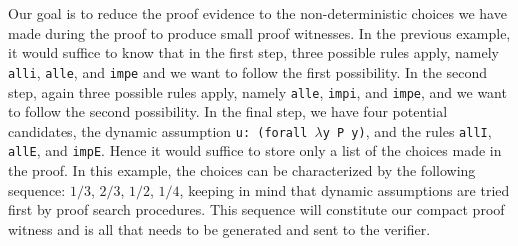 \documentclass{acmconf}
\newcommand{\figfoot}{\vspace{1ex}\hrule}
\newcommand{\fighead}{\hrule\vspace{1.5ex}}
\newcommand{\nil}{\mathsf{nil}}
\newcommand{\vd}{\vdash}
\newcommand{\arrow}{\rightarrow}
\newcommand{\oftp}{\mathord{:}}
\begin{document}

 Our goal is to reduce the proof evidence to the
non-deterministic choices we have made during the proof to produce
small proof witnesses. In the previous example, it would suffice to
know that in the first step, three possible rules apply, namely {\tt
  alli}, {\tt alle}, and {\tt impe} and we want to follow the first
possibility. In the second step, again three possible rules apply,
namely {\tt alle}, {\tt   impi}, and {\tt impe}, and we want to follow
the second possibility. In the final step, we have four potential
candidates, the dynamic assumption {\tt u: (forall $\lambda\!\!$y P
  y)}, and the rules {\tt allI}, {\tt allE}, and {\tt impE}.
 Hence it would suffice to store only a list of the choices made in
 the proof. In this example, the choices can be characterized by the
 following sequence: $1/3$, $2/3$, $1/2$, $1/4$, keeping in mind that
 dynamic assumptions are tried first by proof search procedures. This
 sequence will constitute our compact proof witness and is all that
 needs to be generated and sent to the verifier. 
      
\end{document}

